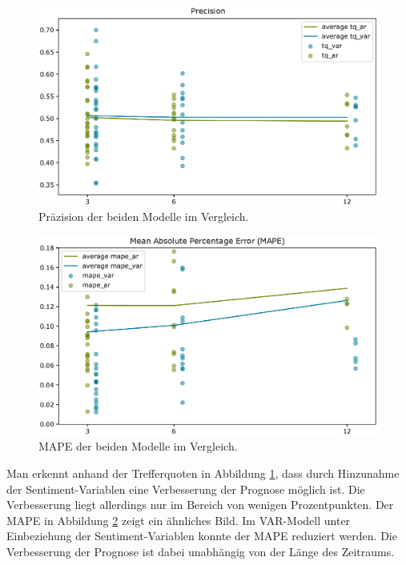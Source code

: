 \documentclass[
	a4paper,
	12pt,
	bibliography=totocnumbered,
	twoside,
]{scrreprt}
\begin{document}
\begin{figure}[H]
	\centering
	\includegraphics[width=.65\textwidth]{images/comparison_prec.eps}
	\caption[Trefferquote der beiden Modelle im Vergleich]{Präzision der beiden Modelle im Vergleich\footnotemark.}
	\label{fig:forecast-accuracy-prec}
\end{figure}

\begin{figure}[H]
	\centering
	\includegraphics[width=.65\textwidth]{images/comparison_mape.eps}
	\caption[MAPE der beiden Modelle im Vergleich]{MAPE der beiden Modelle im Vergleich\footnotemark.}
	\label{fig:forecast-accuracy-mape}
\end{figure}

Man erkennt anhand der Trefferquoten in Abbildung \ref{fig:forecast-accuracy-prec}, dass durch Hinzunahme der Sentiment-Variablen eine Verbesserung der Prognose möglich ist. Die Verbesserung liegt allerdings nur im Bereich von wenigen Prozentpunkten. Der MAPE in Abbildung \ref{fig:forecast-accuracy-mape} zeigt ein ähnliches Bild. Im VAR-Modell unter Einbeziehung der Sentiment-Variablen konnte der MAPE reduziert werden. Die Verbesserung der Prognose ist dabei unabhängig von der Länge des Zeitraums.\\


\newpage
\end{document}
